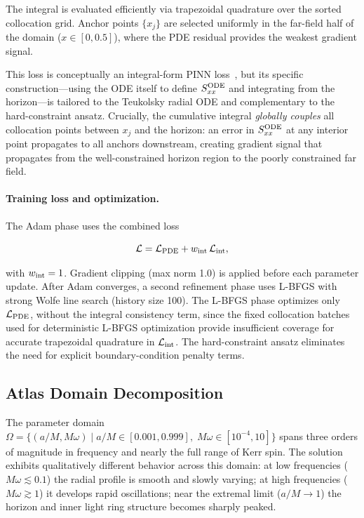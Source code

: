 \documentclass[aps,prd,twocolumn,superscriptaddress,nofootinbib]{revtex4-2}
\begin{document}
The integral is evaluated efficiently via trapezoidal quadrature over the
sorted collocation grid.  Anchor points $\{x_j\}$ are selected uniformly in the
far-field half of the domain ($x \in [0, 0.5]$), where the PDE residual
provides the weakest gradient signal.

This loss is conceptually an integral-form PINN loss~\cite{Saleh:2024integralloss},
but its specific construction---using the ODE itself to define $S_{xx}^{\rm ODE}$
and integrating from the horizon---is tailored to the Teukolsky radial ODE and
complementary to the hard-constraint ansatz.  Crucially, the cumulative integral
\emph{globally couples} all collocation points between $x_j$ and the horizon:
an error in $S_{xx}^{\rm ODE}$ at any interior point propagates to all anchors
downstream, creating gradient signal that propagates from the well-constrained
horizon region to the poorly constrained far field.

\paragraph{Training loss and optimization.} The Adam phase uses the combined loss

\begin{equation}
  \mathcal{L} = \mathcal{L}_{\rm PDE} + w_{\rm int}\,\mathcal{L}_{\rm int},
  \label{eq:adam_loss}
\end{equation}

with $w_{\rm int} = 1$.  Gradient clipping (max norm 1.0) is applied
before each parameter update.  After Adam converges, a second refinement
phase uses L-BFGS with strong Wolfe line search (history size 100).  The
L-BFGS phase optimizes only $\mathcal{L}_{\rm PDE}$, without the integral
consistency term, since the fixed collocation batches used for deterministic
L-BFGS optimization provide insufficient coverage for accurate trapezoidal
quadrature in $\mathcal{L}_{\rm int}$.  The hard-constraint ansatz eliminates
the need for explicit boundary-condition penalty terms.

\subsection{Atlas Domain Decomposition}
\label{sec:atlas}

The parameter domain $\Omega = \{(a/M, M\omega) \mid a/M \in [0.001, 0.999],\;
M\omega \in [10^{-4}, 10]\}$ spans three orders of magnitude in frequency and
nearly the full range of Kerr spin.  The solution exhibits qualitatively
different behavior across this domain: at low frequencies ($M\omega \lesssim
0.1$) the radial profile is smooth and slowly varying; at high frequencies
($M\omega \gtrsim 1$) it develops rapid oscillations; near the extremal limit
($a/M \to 1$) the horizon and inner light ring structure becomes sharply peaked.
\end{document}
